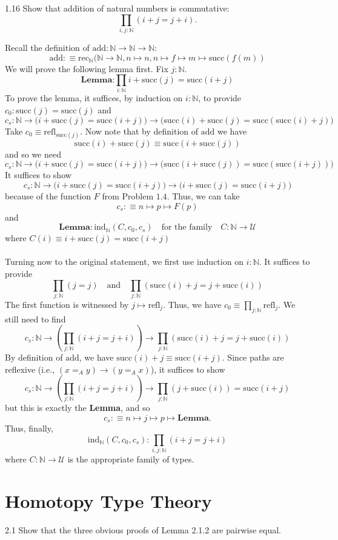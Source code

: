 \documentclass[14pt]{extarticle}
\newcommand{\N}{{\mathbb N}}
\newcommand{\0}{{\mathbf 0}}
\newcommand{\1}{{\mathbf 1}}
\newcommand{\2}{{\mathbf 2}}
\newcommand{\UU}{{\mathcal U}}
\newcommand{\mt}{\mapsto}
\newcommand{\rec}{\mathrm{rec}}
\newcommand{\su}{\mathrm{succ}}
\newcommand{\add}{\mathrm{add}}
\newcommand{\ind}{\mathrm{ind}}
\newcommand{\refl}{\mathrm{refl}}
\begin{document}
\begin{prob}{1.16}{}
Show that addition of natural numbers is commutative: \[\prod_{i,j:\N}(i + j = j+i).\]
\end{prob}
Recall the definition of $\add : \N \to \N \to \N$:
\[\add :\equiv \rec_\N(\N \to \N,n \mt n, n \mt f \mt m \mt \su(f(m))\]
We will prove the following lemma first. Fix $j : \N$.
\[\textbf{Lemma:} \prod_{i:\N} i + \su(j) = \su(i+j)\] To prove the lemma, it suffices, by induction on $i : \N$, to provide $c_0 : \su(j) = \su(j)$ and
\[c_s : \N \to \Big(i + \su(j) = \su(i+j) \Big) \to \Big(\su(i) + \su(j) = \su(\su(i)+j) \Big)\]
Take $c_0 \equiv \refl_{\su(j)}$. Now note that by definition of $\add$ we have 
\[\su(i) + \su(j) \equiv \su(i + \su(j))\] and so we need 
\[c_s : \N \to \Big(i + \su(j) = \su(i+j) \Big) \to \Big(\su(i + \su(j)) = \su(\su(i+j)) \Big)\] It suffices to show 
\[c_s : \N \to \Big(i + \su(j) = \su(i+j) \Big) \to \Big(i + \su(j) = \su(i+j) \Big)\] because of the function $F$ from Problem $1.4$. Thus, we can take \[c_s :\equiv n \mt p \mt F(p)\] and
\[\textbf{Lemma} : \ind_\N(C, c_0,c_s) \quad \text{for the family} \quad C : \N \to \UU\] where $C(i) \equiv i + \su(j) = \su(i+j)$\\\\ 
Turning now to the original statement, we first use induction on $i : \N$. It suffices to provide
\[\prod_{j:\N}(j = j) \quad \text{and} \quad \prod_{j:\N}(\su(i) + j = j+\su(i))\]
The first function is witnessed by $j \mt \refl_j$. Thus, we have $c_0 \equiv \prod_{j : \N}\refl_j$.
We still need to find \[c_s : \N \to \left(\prod_{j:\N}(i + j = j+i) \right) \to \prod_{j:\N}(\su(i) + j = j+\su(i))\]
By definition of $\add$, we have $\su(i) + j \equiv \su(i + j)$.
Since paths are reflexive (i.e., $(x =_A y) \to (y =_A x)$), it suffices to show
\[c_s : \N \to \left(\prod_{j:\N}(i + j = j+i) \right) \to \prod_{j:\N}(j+\su(i)) = \su(i + j)\]
but this is exactly the \textbf{Lemma}, and so
\[c_s :\equiv n \mt j \mt p \mt \textbf{Lemma}.\] Thus, finally,
\[\ind_\N(C, c_0,c_s) : \prod_{i,j:\N}(i + j = j+i)\]
where $C : \N \to \UU$ is the appropriate family of types.


\section*{Homotopy Type Theory}
\begin{prob}{2.1}{}
Show that the three obvious proofs of Lemma 2.1.2 are pairwise equal.
\end{prob}
\end{document}
